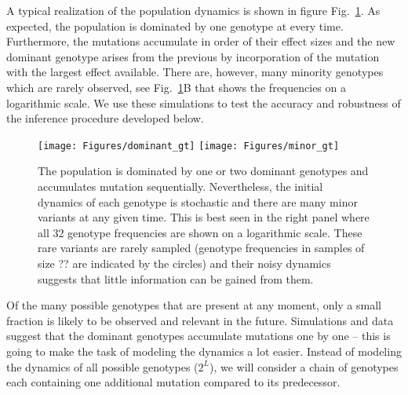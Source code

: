 \documentclass[rmp,twocolumn]{revtex4}
\newcommand{\FIG}[1]{Fig.~\ref{fig:#1}}
\begin{document}
A typical realization of the population dynamics is shown in figure
\FIG{example}. As expected, the population is dominated by one genotype at every
time.
Furthermore, the mutations accumulate in order of their effect sizes and the new
dominant genotype arises from the previous by incorporation of the mutation with
the largest effect available. There are, however, many minority genotypes which
are rarely observed, see \FIG{example}B that shows the frequencies on a
logarithmic scale. We use these simulations to test the accuracy and robustness
of the inference procedure developed below.

\begin{figure}[htp]
\begin{center}
  \texttt{[image: Figures/dominant\_gt]}
  \texttt{[image: Figures/minor\_gt]}
  \caption[labelInTOC]{The population is dominated by one or two dominant
  genotypes and accumulates mutation sequentially. Nevertheless, the initial
  dynamics of each genotype is stochastic and there are many minor variants at
  any given time. This is best seen in the right panel where all 32 genotype
  frequencies are shown on a logarithmic scale. These rare variants are rarely
  sampled (genotype frequencies in samples of size ?? are indicated by the
  circles) and their noisy dynamics suggests that little information can be
  gained from them.}
  \label{fig:example}
\end{center}
\end{figure}

Of the many possible genotypes that are present at any moment, only a small
fraction is likely to be observed and relevant in the future. Simulations and
data suggest that the dominant genotypes accumulate mutations one by one -- this
is going to make the task of modeling the dynamics a lot easier. Instead of
modeling the dynamics of all possible genotypes ($2^L$), we will consider a
chain of genotypes each containing one additional mutation compared to its
predecessor. 
\end{document}
